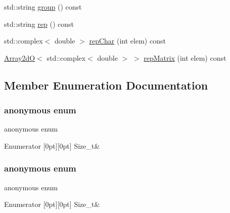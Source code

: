 \begin{DoxyCompactItemize}
std\+::string \mbox{\hyperlink{structHadron_1_1C4nm0ERep_a0d17268ef31fa011daabf7af62deec34}{group}} () const
\item 
std\+::string \mbox{\hyperlink{structHadron_1_1C4nm0ERep_a7f4628e8d080d5552176c65fcbd66e84}{rep}} () const
\item 
std\+::complex$<$ double $>$ \mbox{\hyperlink{structHadron_1_1C4nm0ERep_ae2587ec63f886eaafedfaede40ebdba5}{rep\+Char}} (int elem) const
\item 
\mbox{\hyperlink{classADAT_1_1Array2dO}{Array2dO}}$<$ std\+::complex$<$ double $>$ $>$ \mbox{\hyperlink{structHadron_1_1C4nm0ERep_aa9353c0f2a226224911c51db6f647ccf}{rep\+Matrix}} (int elem) const
\end{DoxyCompactItemize}


\subsection{Member Enumeration Documentation}
\mbox{\label{structHadron_1_1C4nm0ERep_a9ccef0479db79acbb8d491f065dedaa2}} 
\subsubsection{\texorpdfstring{anonymous enum}{anonymous enum}}
{\footnotesize\ttfamily anonymous enum}

\begin{DoxyEnumFields}{Enumerator}
[0pt][0pt]{}\mbox{\label{structHadron_1_1C4nm0ERep_a4274f4ffd23b2bf324c734d8adf03128acf71851a7fd569fd345eb94484bf3ea8}} 
Size\+\_\+t&\\
\hline

\end{DoxyEnumFields}
\mbox{\label{structHadron_1_1C4nm0ERep_ac6850cb411f4e0e0f53be89c72bd798b}} 
\subsubsection{\texorpdfstring{anonymous enum}{anonymous enum}}
{\footnotesize\ttfamily anonymous enum}

\begin{DoxyEnumFields}{Enumerator}
[0pt][0pt]{}\mbox{\label{structHadron_1_1C4nm0ERep_a4274f4ffd23b2bf324c734d8adf03128acf71851a7fd569fd345eb94484bf3ea8}} 
Size\+\_\+t&\\
\hline

\end{DoxyEnumFields}
\mbox{\label{structHadron_1_1C4nm0ERep_a4274f4ffd23b2bf324c734d8adf03128}} 
